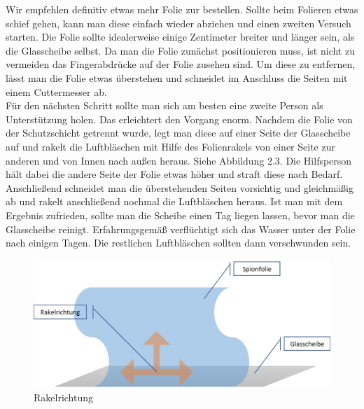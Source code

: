 Wir empfehlen definitiv etwas mehr Folie zur bestellen. Sollte beim Folieren etwas schief gehen, kann man diese einfach wieder abziehen und einen zweiten Versuch starten. Die Folie sollte idealerweise einige Zentimeter breiter und länger sein, als die Glasscheibe selbst. Da man die Folie zunächst positionieren muss, ist nicht zu vermeiden das Fingerabdrücke auf der Folie zusehen sind. Um diese zu entfernen, lässt man die Folie etwas überstehen und schneidet im Anschluss die Seiten mit einem Cuttermesser ab. \\
Für den nächsten Schritt sollte man sich am besten eine zweite Person als Unterstützung holen. Das erleichtert den Vorgang enorm. Nachdem die Folie von der Schutzschicht getrennt wurde, legt man diese auf einer Seite der Glasscheibe auf und rakelt die Luftbläschen mit Hilfe des Folienrakels von einer Seite zur anderen und von Innen nach außen heraus. Siehe Abbildung 2.3. Die Hilfsperson hält dabei die andere Seite der Folie etwas höher und straft diese nach Bedarf. Anschließend schneidet man die überstehenden Seiten vorsichtig und gleichmäßig ab und rakelt anschließend nochmal die Luftbläschen heraus. Ist man mit dem Ergebnis zufrieden, sollte man die Scheibe einen Tag liegen lassen, bevor man die Glasscheibe reinigt. Erfahrungsgemäß verflüchtigt sich das Wasser unter der Folie nach einigen Tagen. Die restlichen Luftbläschen sollten dann verschwunden sein.
\begin{figure}[H]
	\begin{center}
		\includegraphics[scale=0.5]{bilder/Rakelanleitung.jpg}
	\end{center}
	\caption{Rakelrichtung}
\end{figure} 

